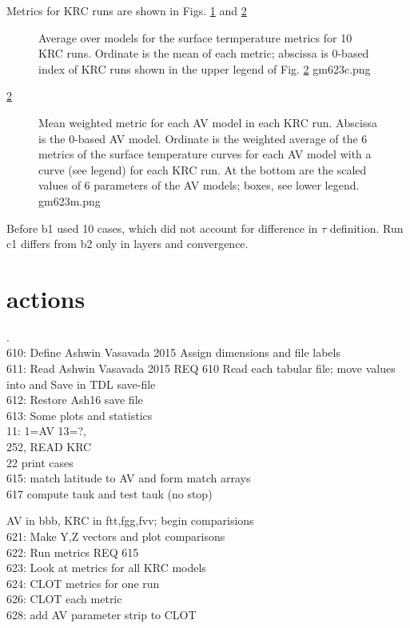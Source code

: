 \documentclass{article}
\begin{document}
Metrics for KRC runs are shown in Figs. \ref{gm623c} and  \ref{gm623m}

\begin{figure}[!ht] 
\caption[Summary metrics]{Average over models for the surface termperature metrics for 10 KRC runs. Ordinate is the mean of each metric; abscissa is 0-based index of KRC runs shown in the upper legend of Fig. \ref{gm623m}
\label{gm623c} gm623c.png }
\end{figure} 

\ref{gm623m}
\begin{figure}[!ht] 
\caption[]{Mean weighted metric for each AV model in each KRC run. Abscissa is the 0-based AV model. Ordinate is the weighted average of the 6 metrics of the surface temperature curves for each AV model with a curve (see legend) for each KRC run. At the bottom are the scaled values of 6 parameters of the AV models; boxes, see lower legend.
\label{gm623m} gm623m.png }
\end{figure} 

Before b1 used 10 cases, which did not account for difference in $\tau$ definition. Run c1 differs from b2 only in layers and convergence.

\section{actions}
.
\\ 610: Define Ashwin Vasavada 2015
\qi Assign dimensions and file labels
\\ 611: Read Ashwin Vasavada 2015 REQ 610
\qi Read each tabular file; move values into  and 
\qi Save in TDL save-file
\\ 612: Restore Ash16 save file 
\\ 613: Some plots and statistics
\\ 11: 1=AV 13=?,
\\ 252, READ KRC 
\\ 22 print cases
\\ 615: match latitude to AV
\qi and form match arrays
\\ 617 compute tauk and test tauk (no stop)

AV in bbb, KRC in ftt,fgg,fvv; begin comparisions
\\ 621: Make Y,Z vectors and plot comparisons 
\\ 622: Run metrics REQ 615 
\\ 623: Look at metrics for all KRC models
\\ 624: CLOT metrics for one run 
\\ 626: CLOT each metric
\\ 628: add AV parameter strip to CLOT
\end{document}
